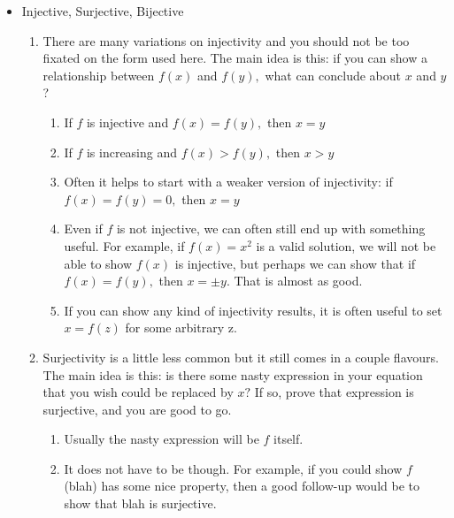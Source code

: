 \begin{itemize}[left=0pt, itemsep=2em]
    \item Injective, Surjective, Bijective
        \begin{enumerate}[left=0pt,label=\textbf{\arabic*.}]
            \item There are many variations on injectivity and you should
                not be too fixated on the form used here. The main idea is
                this: if you can show a relationship between $f(x)$ and
                $f(y),$ what can conclude about $x$ and $y$ ?
                \begin{enumerate}
                    \item If $f$ is injective and $f(x)=f(y),$ then $x=y$
                    \item If $f$ is increasing and $f(x)>f(y),$ then $x>y$
                    \item Often it helps to start with a weaker version of
                        injectivity: if $f(x)=f(y)=0,$ then $x=y$
                    \item Even if $f$ is not injective, we can often still
                        end up with something useful. For example, if
                        $f(x)=x^{2}$ is a valid solution, we will not be
                        able to show $f(x)$ is injective, but perhaps we
                        can show that if $f(x)=f(y),$ then $x=\pm y .$
                        That is almost as good.
                    \item If you can show any kind of injectivity results,
                        it is often useful to set $x=f(z)$ for some
                        arbitrary z.
                \end{enumerate}
            \item Surjectivity is a little less common but it still comes
                in a couple flavours. The main idea is this: is there some
                nasty expression in your equation that you wish could be
                replaced by $x ?$ If so, prove that expression is
                surjective, and you are good to go.
                \begin{enumerate}
                    \item Usually the nasty expression will be $f$ itself.
                    \item It does not have to be though. For example, if
                        you could show $f$ (blah) has some nice property,
                        then a good follow-up would be to show that blah
                        is surjective.
                \end{enumerate}
        \end{enumerate}
\end{itemize}


